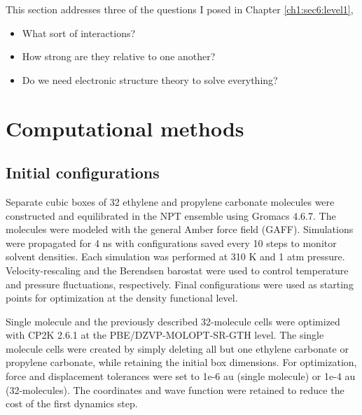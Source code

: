 \begin{ecpc}
   This section addresses three of the questions I posed in Chapter \ref{ch1:sec6:level1},

   \begin{itemize}
       \item What sort of interactions? 
       \item How strong are they relative to one another?
       \item Do we need electronic structure theory to solve everything?
   \end{itemize}
  
  \section{\label{ch4:sec1:level1}Computational methods}
   \subsection{\label{ch4:sec1:level2}Initial configurations}
    Separate cubic boxes of 32 ethylene and propylene carbonate molecules were constructed and equilibrated in the NPT ensemble using Gromacs 4.6.7\cite{gromacs}.
    The molecules were modeled with the general Amber force field (GAFF). Simulations were propagated for 4 ns with configurations saved every 10
    steps to monitor solvent densities. Each simulation was performed at 310 K and 1 atm pressure. Velocity-rescaling and the Berendsen barostat
    were used to control temperature and pressure fluctuations, respectively. Final configurations were used as starting points for optimization at
    the density functional level.

    Single molecule and the previously described 32-molecule cells were optimized with CP2K 2.6.1\cite{hutter2014cp2k} at the PBE/DZVP-MOLOPT-SR-GTH
    level\cite{goedecker1996separable,perdew1996generalized,vandevondele2007gaussian}. The single molecule cells were created by simply deleting all 
    but one ethylene carbonate or propylene carbonate, while retaining the initial box dimensions. For optimization, force and displacement tolerances 
    were set to 1e-6 au (single molecule) or 1e-4 au (32-molecules). The coordinates and wave function were retained to reduce the cost of the first 
    dynamics step.
    

\end{ecpc}
